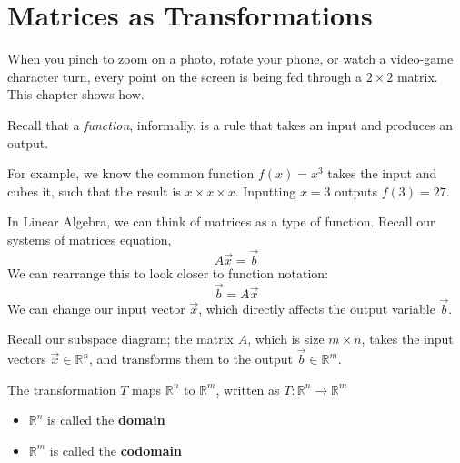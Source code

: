\chapter{Matrices as Transformations}
When you pinch to zoom on a photo, rotate your
phone, or watch a video-game character turn, every point on the screen is
being fed through a $2 \times 2$ matrix. This chapter shows how.

Recall that a \emph{function}, informally, is a rule that takes an input and produces an output. 

For example, we know the common function $f(x) = x^3$ takes the input and cubes it, such that the result is $x \times x \times x$. Inputting $x=3$ outputs $f(3) = 27$. 

In Linear Algebra, we can think of matrices as a type of function. Recall our systems of matrices equation,
$$A\vec{x}=\vec{b}$$
We can rearrange this to look closer to function notation:
$$\vec{b}=A\vec{x}$$
We can change our input vector $\vec{x}$, which directly affects the output variable $\vec{b}$. 

Recall our subspace diagram; the matrix $A$, which is size $m\times n$, takes the input vectors $\vec{x} \in \mathbb R^n$, and transforms them to the output $\vec{b} \in \mathbb R^m$.


The transformation $T$ maps $\mathbb R^n$ to $\mathbb R^m$, written as $T: \mathbb R^{n}\to \mathbb R^m$
\begin{itemize}
    \item $\mathbb R^n$ is called the \textbf{domain}
    \item $\mathbb R^m$ is called the \textbf{codomain}
\end{itemize}

